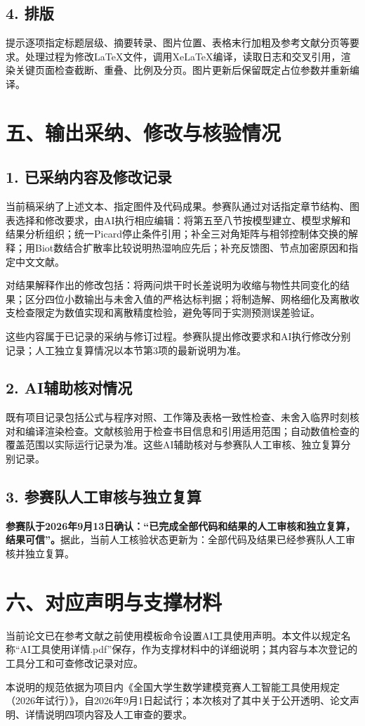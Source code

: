 \documentclass[UTF8,a4paper,zihao=-4]{ctexart}
\begin{document}
\subsection*{4. 排版}
提示逐项指定标题层级、摘要转录、图片位置、表格末行加粗及参考文献分页等要求。处理过程为修改LaTeX文件，调用XeLaTeX编译，读取日志和交叉引用，渲染关键页面检查截断、重叠、比例及分页。图片更新后保留既定占位参数并重新编译。

\clearpage
\section*{五、输出采纳、修改与核验情况}
\subsection*{1. 已采纳内容及修改记录}
当前稿采纳了上述文本、指定图件及代码成果。参赛队通过对话指定章节结构、图表选择和修改要求，由AI执行相应编辑：将第五至八节按模型建立、模型求解和结果分析组织；统一Picard停止条件引用；补全三对角矩阵与相邻控制体交换的解释；用Biot数结合扩散率比较说明热湿响应先后；补充反馈图、节点加密原因和指定中文文献。

对结果解释作出的修改包括：将两问烘干时长差说明为收缩与物性共同变化的结果；区分四位小数输出与未舍入值的严格达标判据；将制造解、网格细化及离散收支检查限定为数值实现和离散精度检验，避免等同于实测预测误差验证。

这些内容属于已记录的采纳与修订过程。参赛队提出修改要求和AI执行修改分别记录；人工独立复算情况以本节第3项的最新说明为准。

\subsection*{2. AI辅助核对情况}
既有项目记录包括公式与程序对照、工作簿及表格一致性检查、未舍入临界时刻核对和编译渲染检查。文献核验用于检查书目信息和引用适用范围；自动数值检查的覆盖范围以实际运行记录为准。这些AI辅助核对与参赛队人工审核、独立复算分别记录。

\subsection*{3. 参赛队人工审核与独立复算}
\textbf{参赛队于2026年9月13日确认：“已完成全部代码和结果的人工审核和独立复算，结果可信”。}据此，当前人工核验状态更新为：全部代码及结果已经参赛队人工审核并独立复算。

\section*{六、对应声明与支撑材料}
当前论文已在参考文献之前使用模板命令\texttt{\string\CumcmAIUsed}设置AI工具使用声明。本文件以规定名称“AI工具使用详情.pdf”保存，作为支撑材料中的详细说明；其内容与本次登记的工具分工和可查修改记录对应。

本说明的规范依据为项目内《全国大学生数学建模竞赛人工智能工具使用规定（2026年试行）》，自2026年9月1日起试行；本次核对了其中关于公开透明、论文声明、详情说明四项内容及人工审查的要求。
\end{document}
